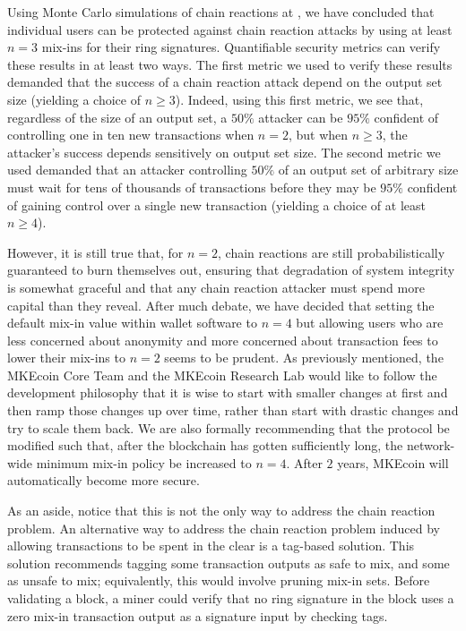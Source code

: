 \documentclass[12pt,english]{mrl}
\theoremstyle{definition}
\renewcommand{\geq}{\geqslant}
\numberwithin{equation}{section}
\numberwithin{figure}{section}
\numberwithin{equation}{section}
\numberwithin{equation}{section}
\numberwithin{figure}{section}
\begin{document}
Using Monte Carlo simulations of chain reactions at \cite{saturationUTXO}, we have concluded that individual users can be protected against chain reaction attacks by using at least $n=3$ mix-ins for their ring signatures. Quantifiable security metrics can verify these results in at least two ways. The first metric we used to verify these results demanded that the success of a chain reaction attack depend on the output set size (yielding a choice of $n \geq 3$). Indeed, using this first metric, we see that, regardless of the size of an output set, a $50\%$ attacker can be $95\%$ confident of controlling one in ten new transactions when $n=2$, but when $n\geq 3$, the attacker's success depends sensitively on output set size. The second metric we used demanded that an attacker controlling $50\%$ of an output set of arbitrary size must wait for tens of thousands of transactions before they may be $95\%$ confident of gaining control over a single new transaction (yielding a choice of at least $n \geq 4$).

However, it is still true that, for $n=2$, chain reactions are still probabilistically guaranteed to burn themselves out, ensuring that degradation of system integrity is somewhat graceful and that any chain reaction attacker must spend more capital than they reveal. After much debate, we have decided that setting the default mix-in value within wallet software to $n=4$ but allowing users who are less concerned about anonymity and more concerned about transaction fees to lower their mix-ins to $n=2$ seems to be prudent. As previously mentioned, the MKEcoin Core Team and the MKEcoin Research Lab would like to follow the development philosophy that it is wise to start with smaller changes at first and then ramp those changes up over time, rather than start with drastic changes and try to scale them back. We are also formally recommending that the protocol be modified such that, after the blockchain has gotten sufficiently long, the network-wide minimum mix-in policy be increased to $n=4$. After $2$ years, MKEcoin will automatically become more secure.

As an aside, notice that this is not the only way to address the chain reaction problem. An alternative way to address the chain reaction problem induced by allowing transactions to be spent in the clear is a tag-based solution. This solution recommends tagging some transaction outputs as safe to mix, and some as unsafe to mix; equivalently, this would involve pruning mix-in sets. Before validating a block, a miner could verify that no ring signature in the block uses a zero mix-in transaction output as a signature input by checking tags.
\end{document}
